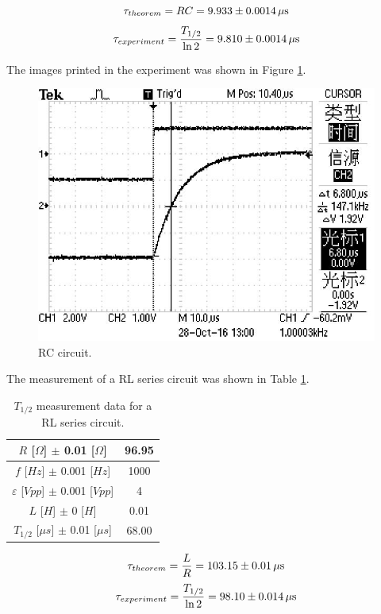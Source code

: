 \documentclass{article}
\begin{document}
$$\tau_{theorem}=RC=9.933\pm0.0014\,\rm{\mu s}$$
$$\tau_{experiment}=\frac{T_{1/2}}{\ln 2}=9.810\pm0.0014\,\rm{\mu s}$$

The images printed in the experiment was shown in Figure \ref{fig-1}.

\begin{figure}[H]
	\centering
	\includegraphics[scale=0.6]{TEK0002.jpg}
	\caption{RC circuit.}
	\label{fig-1}
\end{figure}

The measurement of a RL series circuit was shown in Table \ref{tab-2}.

\begin{table}[!h]
\begin{center}
\begin{tabular}{|c|c|}
\hline
$R$ [$\Omega$] $\pm$ 0.01 [$\Omega$]	&	96.95	\\
\hline
$f$ [$Hz$] $\pm$ 0.001 [$Hz$]	&	1000	\\
\hline
$\varepsilon$ [$Vpp$] $\pm$ 0.001 [$Vpp$]	&	4	\\
\hline
$L$ [$H$] $\pm$ 0 [$H$]	&	0.01	\\
\hline
$T_{1/2}$ [$\mu s$] $\pm$ 0.01 [$\mu s$]	&	68.00	\\
\hline
\end{tabular}
\caption{$T_{1/2}$ measurement data for a RL series circuit.}
\label{tab-2}
\end{center}
\end{table}

$$\tau_{theorem}=\frac{L}{R}=103.15\pm 0.01\,\rm{\mu s}$$
$$\tau_{experiment}=\frac{T_{1/2}}{\ln 2}=98.10\pm0.014\,\rm{\mu s}$$
\end{document}
